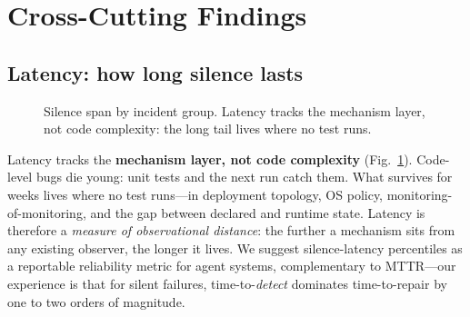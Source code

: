 \section{Cross-Cutting Findings}\label{sec:findings}

\subsection{Latency: how long silence lasts}\label{sec:latency}

\begin{figure}[t]
\centering
{}
\caption{Silence span by incident group. Latency tracks the mechanism
layer, not code complexity: the long tail lives where no test runs.}
\label{fig:latency}
\end{figure}

Latency tracks the \textbf{mechanism layer, not code complexity}
(Fig.~\ref{fig:latency}). Code-level bugs die young: unit tests and the
next run catch them. What survives for weeks lives where no test
runs---in deployment topology, OS policy, monitoring-of-monitoring, and
the gap between declared and runtime state. Latency is therefore a
\emph{measure of observational distance}: the further a mechanism sits
from any existing observer, the longer it lives. We suggest
silence-latency percentiles as a reportable reliability metric for agent
systems, complementary to MTTR---our experience is that for silent
failures, time-to-\emph{detect} dominates time-to-repair by one to two
orders of magnitude.

